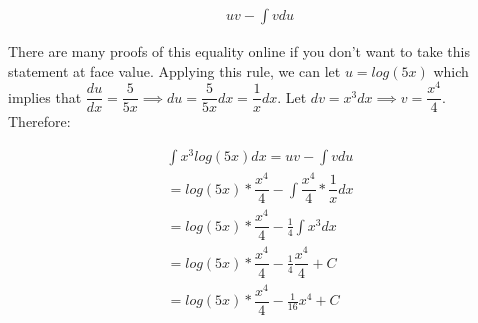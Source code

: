\documentclass[12pt]{article}
\begin{document}
\begin{enumerate}
\begin{align*}
 uv - \int v du
\end{align*}

There are many proofs of this equality online if you don't want to take this statement at face value. Applying this rule, we can let $u=log(5x)$ which implies that $\dfrac{du}{dx}=\dfrac{5}{5x} \implies du= \dfrac{5}{5x}dx = \dfrac{1}{x}dx$. Let $dv = x^3 dx \implies v=\dfrac{x^4}{4}$. Therefore:

\begin{align*}
\int x^3log(5x) dx =  uv - \int v du\\
=   log(5x)* \dfrac{x^4}{4} -  \int \dfrac{x^4}{4}*\dfrac{1}{x} dx  \\
=   log(5x)* \dfrac{x^4}{4} -  \frac{1}{4} \int x^3 dx  \\
=   log(5x)* \dfrac{x^4}{4} -  \frac{1}{4} \dfrac{x^4}{4} +C  \\
=   log(5x)* \dfrac{x^4}{4} -  \frac{1}{16} x^4+C \\
\end{align*}

\end{enumerate}
\end{document}
